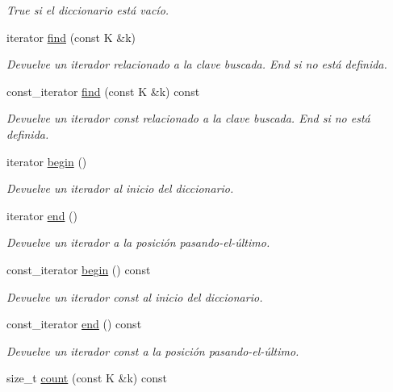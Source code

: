 \begin{DoxyCompactItemize}
\begin{DoxyCompactList}\small\item\em True si el diccionario está vacío. \end{DoxyCompactList}\item 
iterator \hyperlink{classlinear__map_a227924393723570ac58f79fd194aac61}{find} (const K \&k)
\begin{DoxyCompactList}\small\item\em Devuelve un iterador relacionado a la clave buscada. End si no está definida. \end{DoxyCompactList}\item 
const\-\_\-iterator \hyperlink{classlinear__map_a30492a8c9ad1cef02185a9a6ce439114}{find} (const K \&k) const 
\begin{DoxyCompactList}\small\item\em Devuelve un iterador const relacionado a la clave buscada. End si no está definida. \end{DoxyCompactList}\item 
iterator \hyperlink{classlinear__map_a88a219ae647727d1b7e67c2dbe36d972}{begin} ()
\begin{DoxyCompactList}\small\item\em Devuelve un iterador al inicio del diccionario. \end{DoxyCompactList}\item 
iterator \hyperlink{classlinear__map_a29f90bee46581029b6ce496d4ea46683}{end} ()
\begin{DoxyCompactList}\small\item\em Devuelve un iterador a la posición pasando-\/el-\/último. \end{DoxyCompactList}\item 
const\-\_\-iterator \hyperlink{classlinear__map_a583872ffc15171c0d7c3caf307d2d9fe}{begin} () const 
\begin{DoxyCompactList}\small\item\em Devuelve un iterador const al inicio del diccionario. \end{DoxyCompactList}\item 
const\-\_\-iterator \hyperlink{classlinear__map_a0839117b87a8ad0a340df43c942779ad}{end} () const 
\begin{DoxyCompactList}\small\item\em Devuelve un iterador const a la posición pasando-\/el-\/último. \end{DoxyCompactList}\item 
size\-\_\-t \hyperlink{classlinear__map_a99fb7cbd872a6536bcdf00a16255533a}{count} (const K \&k) const 

\end{DoxyCompactItemize}
